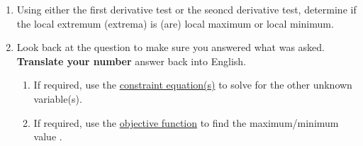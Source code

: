 \begin{tcolorbox}[title={Solving \textbf{Constrained} Optimization Problems: Problem-Solving Strategy}]
\begin{enumerate}[leftmargin=*]
\begin{enumerate}
    \end{enumerate}
    \renewcommand{\labelenumi}{\arabic{enumi}}
\item Using either the first derivative test or the seoncd derivative test, determine if the local extremum (extrema) is (are) local maximum or local minimum. 
\item Look back at the question to make sure you answered what was asked. \textbf{Translate your number} answer back into English.
\renewcommand{\labelenumi}{(\alph{enumi})}
    \begin{enumerate}
        \item If required, use the \underline{constraint equation(s)} to solve for the other unknown variable(s). 
        \item If required, use the \underline{objective function} to find the maximum/minimum value . 
    \end{enumerate}
\end{enumerate}
\end{tcolorbox}
\newpage
